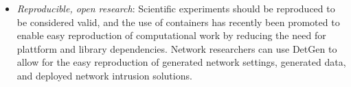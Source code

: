 \documentclass[conference]{IEEEtran}
\begin{document}
\begin{itemize}



\item \textit{Reproducible, open research}: Scientific experiments should be reproduced to be considered valid, and the use of containers has recently been promoted to enable easy reproduction of computational work by reducing the need for plattform and library dependencies. Network researchers can use DetGen to allow for the easy reproduction of generated network settings, generated data, and deployed network intrusion solutions. 

\end{itemize}






\end{document}
